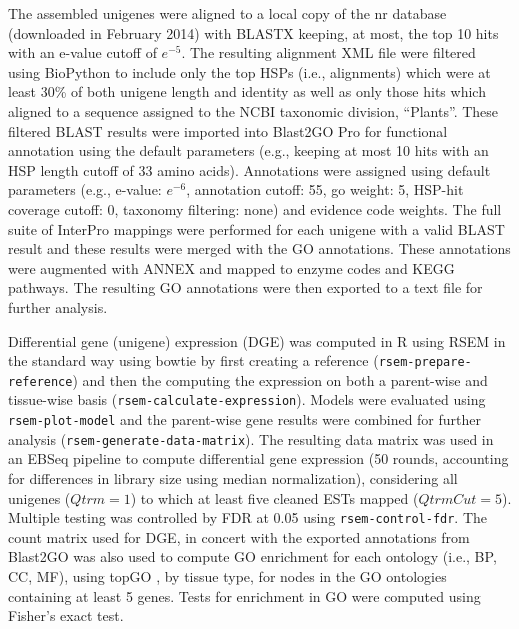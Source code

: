 \documentclass[11pt]{article}
\begin{document}
The assembled unigenes were aligned to a local copy of the nr database
(downloaded in February 2014) with BLASTX \citep{citeulike:238188}
keeping, at most, the top 10 hits with an e-value cutoff of
$e^{-5}$. The resulting alignment XML file were filtered using
BioPython \citep[v.\ 1.6.4]{citeulike:4202607} to include only the top
HSPs (i.e., alignments) which were at least 30\% of both unigene
length and identity as well as only those hits which aligned to a
sequence assigned to the NCBI taxonomic division, ``Plants''. These
filtered BLAST results were imported into Blast2GO Pro \citep[v.\
2.7.2, bg2\_may14]{citeulike:2733895} for functional annotation using
the default parameters (e.g., keeping at most 10 hits with an HSP
length cutoff of 33 amino acids).  Annotations were assigned using
default parameters (e.g., e-value: $e^{-6}$, annotation cutoff: 55, go
weight: 5, HSP-hit coverage cutoff: 0, taxonomy filtering: none) and
evidence code weights. The full suite of InterPro
\citep{citeulike:12942060} mappings were performed for each unigene
with a valid BLAST result and these results were merged with the GO
annotations.  These annotations were augmented with ANNEX
\citep{annex} and mapped to enzyme codes and KEGG
\citep{citeulike:9172127} pathways. The resulting GO annotations were
then exported to a text file for further analysis.

Differential gene (unigene) expression (DGE) was computed in R
\citep[v. 3.1.1]{R} using RSEM
\citep[v. 1.2.15]{Li:BmcBioinformatics:2011} in the standard way using
bowtie \citep[v. 2.2.3]{Langmead:NatMethods:2012} by first creating a
reference (\texttt{rsem-prepare-reference}) and then the computing the
expression on both a parent-wise and tissue-wise basis
(\texttt{rsem-calculate-expression}). Models were evaluated using
\texttt{rsem-plot-model} and the parent-wise gene results were
combined for further analysis
(\texttt{rsem-generate-data-matrix}). The resulting data matrix was
used in an EBSeq \citep{Leng:Bioinformatics:2013} pipeline to compute
differential gene expression (50 rounds, accounting for differences in
library size using median normalization), considering all unigenes
($Qtrm=1$) to which at least five cleaned ESTs mapped
($QtrmCut=5$). Multiple testing was controlled by FDR
\citep{benjamini1995controlling} at 0.05 using
\texttt{rsem-control-fdr}.  The count matrix used for DGE, in concert
with the exported annotations from Blast2GO was also used to compute
GO enrichment for each ontology (i.e., BP, CC, MF), using topGO
\citep{topgo}, by tissue type, for nodes in the GO ontologies
containing at least 5 genes.  Tests for enrichment in GO were computed
using Fisher's exact test.
\end{document}
